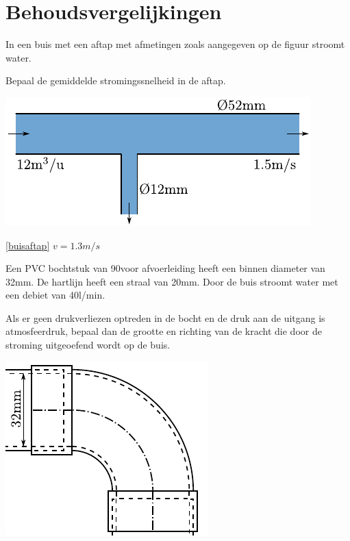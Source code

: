 \chapter{Behoudsvergelijkingen}
\label{sec:Behoudsvergelijkingen}
	\begin{toepassing}
		\label{buisaftap}
In een buis met een aftap met afmetingen zoals aangegeven op de figuur stroomt water.
		
Bepaal de gemiddelde stromingssnelheid in de aftap.
		\begin{center}
			\includegraphics{fig/behoudsvergelijkingen/buisaftap}
		\end{center}
	\end{toepassing}
	\begin{antwoord}{\ref{buisaftap}}
		$v = 1.3\unit{m/s}$
	\end{antwoord}
	\begin{toepassing}
		\label{afvoerbocht}
Een PVC bochtstuk van 90\deg voor afvoerleiding heeft een binnen diameter van 32mm. De hartlijn heeft een straal van 20mm. Door de buis stroomt water met een debiet van 40l/min.
		
Als er geen drukverliezen optreden in de bocht en de druk aan de uitgang is atmosfeerdruk, bepaal dan de grootte en richting van de kracht die door de stroming uitgeoefend wordt op de buis.
		\begin{center}
			\includegraphics{fig/behoudsvergelijkingen/afvoerbocht}
		\end{center}
	\end{toepassing}
